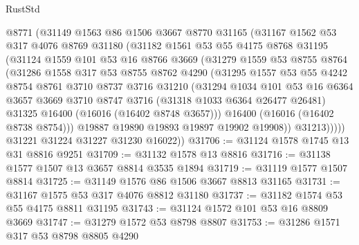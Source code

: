 \begin{lexlean}{RustStd}
\begin{coremodule}
          @8771
          (@31149
            @1563
            @86
            @1506
            @3667
            @8770
            @31165
            (@31167
              @1562
              @53
              @317
              @4076
              @8769
              @31180
              (@31182
                @1561
                @53
                @55
                @4175
                @8768
                @31195
                (@31124
                  @1559
                  @101
                  @53
                  @16
                  @8766
                  @3669
                  (@31279
                    @1559
                    @53
                    @8755
                    @8764
                    (@31286
                      @1558
                      @317
                      @53
                      @8755
                      @8762
                      @4290
                      (@31295
                        @1557
                        @53
                        @55
                        @4242
                        @8754
                        @8761
                        @3710
                        @8737
                        @3716
                        @31210
                        (@31294
                          @1034
                          @101
                          @53
                          @16
                          @6364
                          @3657
                          @3669
                          @3710
                          @8747
                          @3716
                          (@31318 @1033 @6364 @26477 @26481)
                          @31325
                          @16400
                          (@16016 (@16402 @8748 @3657)))
                        @16400
                        (@16016 (@16402 @8738 @8754)))
                      @19887
                      @19890
                      @19893
                      @19897
                      @19902
                      @19908))
                  @31213)))))
        @31221
        @31224
        @31227
        @31230
        @16022))
@31706 := @31124 @1578 @1745 @13 @31 @8816 @9251
@31709 := @31132 @1578 @13 @8816
@31716 := @31138 @1577 @1507 @13 @3657 @8814 @3535 @1894
@31719 := @31119 @1577 @1507 @8814
@31725 := @31149 @1576 @86 @1506 @3667 @8813 @31165
@31731 := @31167 @1575 @53 @317 @4076 @8812 @31180
@31737 := @31182 @1574 @53 @55 @4175 @8811 @31195
@31743 := @31124 @1572 @101 @53 @16 @8809 @3669
@31747 := @31279 @1572 @53 @8798 @8807
@31753 := @31286 @1571 @317 @53 @8798 @8805 @4290

\end{coremodule}
\end{lexlean}
